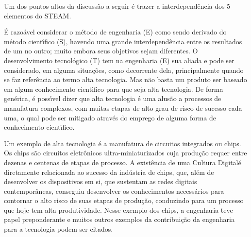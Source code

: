 \documentclass[
12pt,		%
openright,	%
twoside,  %
a4paper,			%
chapter=TITLE,		%
english,			%
french,				%
spanish,			%
brazil				%
]{USPSC-classe/USPSC}
\begin{document}
Um dos pontos altos da discuss\~ao a seguir \'e trazer a interdepend\^encia dos 5 elementos do STEAM.

















\'E razo\'avel considerar o m\'etodo de engenharia (E) como sendo derivado do m\'etodo cient\'{\i}fico (S), havendo uma grande interdepend\^encia entre os resultados de um no outro; muito embora seus objetivos sejam diferentes. O desenvolvimento tecnol\'ogico (T) tem na engenharia (E) sua aliada e pode ser considerado, em alguma situa\c{c}\~oes, como decorrente dela, principalmente quando se faz refer\^encia ao termo \textquotedbl alta tecnologia\textquotedbl . Mas n\~ao basta um produto ser baseado em algum conhecimento cient\'{\i}fico para que seja alta tecnologia. De forma gen\'erica, \'e poss\'{\i}vel dizer que \textquotedbl alta tecnologia \textquotedbl  \'e uma alus\~ao a processos de manufatura complexos, com muitas etapas de alto grau de risco de sucesso cada uma, o qual pode ser mitigado atrav\'es do emprego de alguma forma de conhecimento cient\'{\i}fico.

















Um exemplo de alta tecnologia \'e a manufatura de circuitos integrados ou chips. Os chips s\~ao circuitos eletr\^onicos ultra-miniaturizados cuja produ\c{c}\~ao requer entre dezenas e centenas de etapas de processo. A exist\^encia de uma \textquotedbl Cultura Digital\textquotedbl  \'e diretamente relacionada ao sucesso da ind\'ustria de chips, que, al\'em de desenvolver os dispositivos em si, que sustentam as redes digitais contempor\^aneas, conseguiu desenvolver os conhecimentos necess\'arios para contornar o alto risco de suas etapas de produ\c{c}\~ao, conduzindo para um processo que hoje tem alta produtividade. Nesse exemplo dos chips, a engenharia teve papel preponderante e muitos outros exemplos da contribui\c{c}\~ao da engenharia para a tecnologia podem ser citados.
\end{document}
